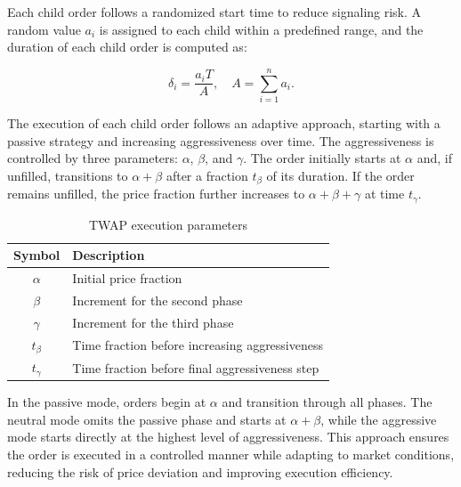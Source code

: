 Each child order follows a randomized start time to reduce signaling risk. A random value $a_i$ is assigned to each child within a predefined range, and the duration of each child order is computed as:

\begin{equation}
    \delta_i = \frac{a_i T}{A}, \quad A = \sum_{i=1}^{n} a_i.
    \label{eq:sigma and A}
\end{equation}

The execution of each child order follows an adaptive approach, starting with a passive strategy and increasing aggressiveness over time. The aggressiveness is controlled by three parameters: $\alpha$, $\beta$, and $\gamma$. The order initially starts at $\alpha$ and, if unfilled, transitions to $\alpha + \beta$ after a fraction $t_{\beta}$ of its duration. If the order remains unfilled, the price fraction further increases to $\alpha + \beta + \gamma$ at time $t_{\gamma}$.

\begin{table}[h]
    \centering
    \begin{tabular}{|c|l|}
        \hline
        \textbf{Symbol} & \textbf{Description} \\ \hline
        $\alpha$ & Initial price fraction \\ \hline
        $\beta$ & Increment for the second phase \\ \hline
        $\gamma$ & Increment for the third phase \\ \hline
        $t_{\beta}$ & Time fraction before increasing aggressiveness \\ \hline
        $t_{\gamma}$ & Time fraction before final aggressiveness step \\ \hline
    \end{tabular} \label{tb:TWAP parameters}
    \caption{TWAP execution parameters}
\end{table}

In the passive mode, orders begin at $\alpha$ and transition through all phases. The neutral mode omits the passive phase and starts at $\alpha + \beta$, while the aggressive mode starts directly at the highest level of aggressiveness. This approach ensures the order is executed in a controlled manner while adapting to market conditions, reducing the risk of price deviation and improving execution efficiency.

